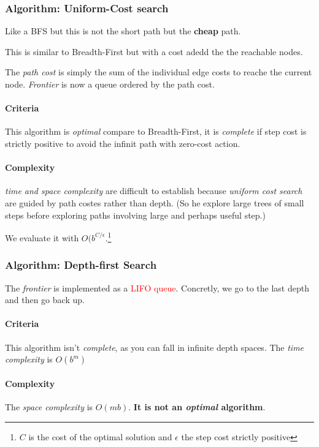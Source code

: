 \subsubsection{Algorithm: Uniform-Cost search}

Like a BFS but this is not the short path but the \textbf{cheap} path.

This is similar to Breadth-First but with a cost adedd the the reachable
nodes. 

The \textit{path  cost} is simply the sum of  the individual edge
costs  to reache  the current  node.  \textit{Frontier} is  now a  queue
ordered by the path cost.

\paragraph{Criteria}
This algorithm is \textit{optimal} compare to Breadth-First, it is \textit{complete} if step cost is strictly positive to avoid the infinit path with zero-cost action.

\paragraph{Complexity}

\textit{time and  space complexity}  are difficult to  establish because
\textit{uniform cost search} are guided by path costes rather than depth.
(So he explore large trees of  small steps before
exploring paths involving large and perhaps useful step.)

We evaluate it with $O(b^{C/\epsilon}$.\footnote{$C$ is the cost of the optimal solution and $\epsilon$ the step cost strictly positive}

\subsubsection{Algorithm: Depth-first Search}

The \textit{frontier}  is implemented as a  \textcolor{red}{LIFO queue}.
Concretly, we go to the last depth and then go back up.

\paragraph{Criteria}
This algorithm isn't \textit{complete}, as you can fall in infinite depth spaces. The \textit{time complexity} is $O(b^m)$ 

\paragraph{Complexity}
The \textit{space complexity} is $O(mb)$. \textbf{It is not an \textit{optimal} algorithm}.

